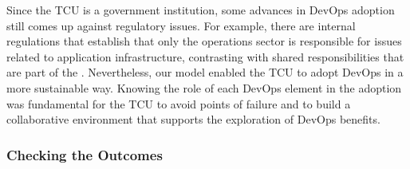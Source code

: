 Since the TCU is a government institution, some advances in DevOps adoption still comes up
against regulatory issues. For example, there are internal regulations that
establish that only the operations sector is responsible for issues related to
application infrastructure, contrasting with shared responsibilities that are
part of the \cc. Nevertheless, our model enabled the TCU to adopt DevOps in a more
sustainable way. Knowing the role
of each DevOps element in the adoption was fundamental for the TCU to avoid points
of failure and to build a collaborative environment that supports the
exploration of DevOps benefits.

\subsubsection{Checking the Outcomes}

